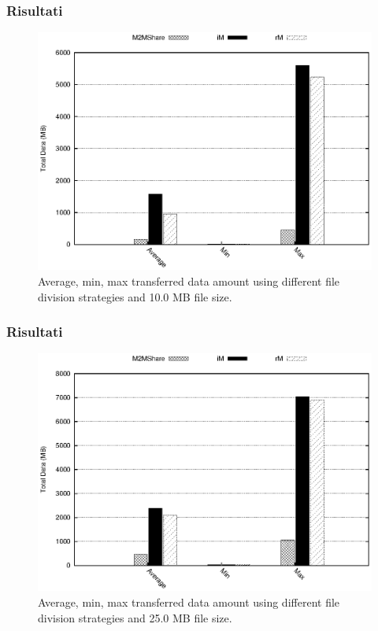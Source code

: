 \documentclass{beamer}
\begin{document}
\begin{frame}
\frametitle{Risultati}
\begin{center}
\begin{figure}[ht]
\includegraphics[scale=0.7]{../grafici/dataDFS_10MB.eps}
\caption{Average, min, max transferred data amount using different file division strategies and 10.0 MB file size.}
\end{figure}
\end{center}
\end{frame}

\begin{frame}
\frametitle{Risultati}
\begin{center}
\begin{figure}[ht]
\includegraphics[scale=0.7]{../grafici/dataDFS_25MB.eps}
\caption{Average, min, max transferred data amount using different file division strategies and 25.0 MB file size.}
\end{figure}
\end{center}
\end{frame}
\end{document}

